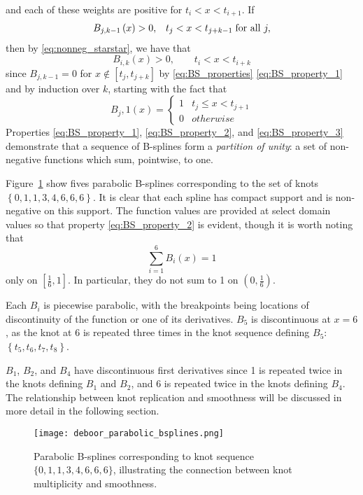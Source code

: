 \documentclass[12pt]{article}
\begin{document}
\begin{enumerate}
\[\]
and each of these weights are positive for $t_i < x < t_{i+1}$. If
\[
\begin{array}{lr}
B_{j,k-1}\left(x\right) > 0, & t_j < x < t_{j+k-1} \; \textup{for all } j,
\end{array}
\]
then by \ref{eq:nonneg_starstar}, we have that 
\[
B_{i,k}\left(x\right) > 0,  \qquad t_i < x < t_{i+k}
\]
since $B_{j,k-1}= 0$ for $x \not \in \left[t_j,t_{j+k}\right]$ by \ref{eq:BS_properties} \ref{eq:BS_property_1} and by induction over $k$, starting with the fact that 
\[
B_j,1\left(x\right) = \left\{ \begin{array}{lr}
1 & t_j \le x < t_{j+1}\\
0 & otherwise
\end{array}\right.
\]
Properties \ref{eq:BS_property_1}, \ref{eq:BS_property_2}, and \ref{eq:BS_property_3} demonstrate that a sequence of B-splines form a \emph{partition of unity}: a set of non-negative functions which sum, pointwise, to one.
\end{enumerate}

\begin{example}
Figure~\ref{fig:deboor_bspline_basis} show fives parabolic B-splines corresponding to the set of knots $\left\{0,1,1,3,4,6,6,6 \right\}$. It is clear that each spline has compact support and is non-negative on this support. The function values are provided at select domain values so that property \ref{eq:BS_property_2} is evident, though it is worth noting that 
\[
\sum_{i=1}^6 B_i\left(x\right) = 1
\]
only on $\left[\frac{1}{6},1\right]$. In particular, they do not sum to 1 on $\left(0,\frac{1}{6}\right)$. 

Each $B_i$ is piecewise parabolic, with the breakpoints being locations of discontinuity of the function or one of its derivatives. $B_5$ is discontinuous at $x=6$, as the knot at 6 is repeated three times in the knot sequence defining $B_5$: $\left\{t_5,t_6,t_7,t_8\right\}$.

$B_1$, $B_2$, and $B_4$ have discontinuous first derivatives since 1 is repeated twice in the knots defining $B_1$ and $B_2$, and 6 is repeated twice in the knots defining $B_4$. The relationship between knot replication and smoothness will be discussed in more detail in the following section.

\begin{figure}[h]
 \begin{center}
 \graphicspath{{img/}}
  \texttt{[image: deboor\_parabolic\_bsplines.png]}
  \caption{Parabolic B-splines corresponding to knot sequence $\{0,1,1,3,4,6,6,6\}$, illustrating the connection between knot multiplicity and smoothness.}\label{fig:deboor_bspline_basis}
\end{center}
\end{figure}
\end{example}
\end{document}
